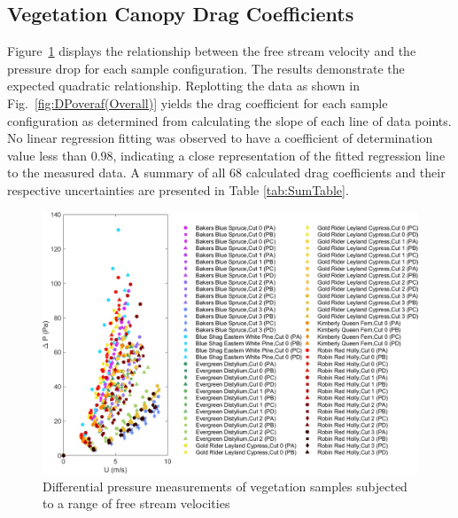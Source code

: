 \documentclass[12pt]{article}
\begin{document}
\pagebreak


\subsection{Vegetation Canopy Drag Coefficients}
\label{ssec:headingscap}

Figure~\ref{fig:DPvU(Overall)} displays the relationship between the free stream velocity and the pressure drop for each sample configuration. The results demonstrate the expected quadratic relationship. Replotting the data as shown in Fig.~\ref{fig:DPoveraf(Overall)} yields the drag coefficient for each sample configuration as determined from calculating the slope of each line of data points. No linear regression fitting was observed to have a coefficient of determination value less than 0.98, indicating a close representation of the fitted regression line to the measured data. A summary of all 68 calculated drag coefficients and their respective uncertainties are presented in Table \ref{tab:SumTable}.

\begin{figure} [!]
	\centering
	\includegraphics[width=\textwidth,keepaspectratio]{Picture8.jpg}
	\caption{Differential pressure measurements of vegetation samples subjected to a range of free stream velocities}
	\label{fig:DPvU(Overall)}
\end{figure}
\end{document}
